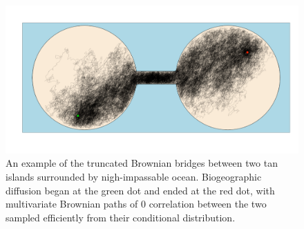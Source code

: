 \begin{figure}[h]
\centering
\includegraphics[width=160mm]{figures/biogeographic_diffusion.png}
\caption[Truncated Multivariate Brownian Motion in the Context of Biogeographic Diffusion]{An example of the truncated Brownian bridges between two tan islands surrounded by nigh-impassable ocean. Biogeographic diffusion began at the green dot and ended at the red dot, with multivariate Brownian paths of 0 correlation between the two sampled efficiently from their conditional distribution. \label{overflow} \label{fig:truncBrownMot}}
\end{figure}
